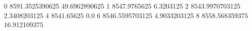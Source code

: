 0 8591.3525390625 49.6962890625
1 8547.9765625 6.3203125
2 8543.9970703125 2.3408203125
4 8541.65625 0.0
6 8546.5595703125 4.9033203125
8 8558.568359375 16.912109375
